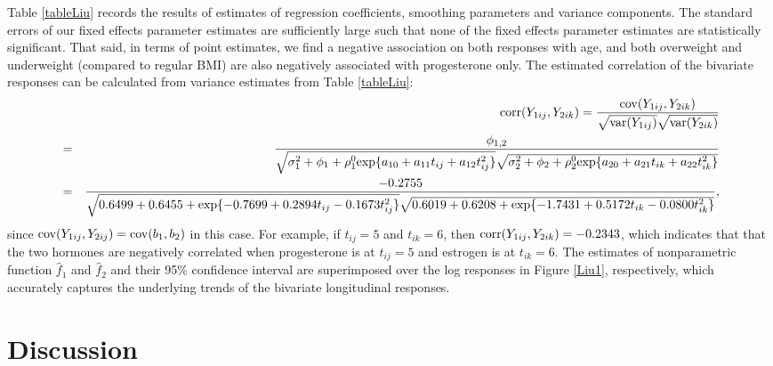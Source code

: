 \documentclass[review]{elsarticle}
\begin{document}
Table \ref{tableLiu} records the results of estimates of regression coefficients, smoothing parameters and variance components. The standard errors of our fixed effects parameter estimates are sufficiently large such that none of the fixed effects parameter estimates are statistically significant. That said, in terms of point estimates, we find a negative association on both responses with age, and  both overweight and underweight (compared to regular BMI) are also negatively associated with  progesterone only. 
The estimated correlation of the bivariate responses can be calculated from variance estimates from Table  \ref{tableLiu}:
\begin{eqnarray*}
&&
{\rm corr}(Y_{1ij}, Y_{2ik}) = {{\rm cov}(Y_{1ij}, Y_{2ik}) \over \sqrt {{\rm var}(Y_{1ij})} \sqrt {{\rm var}(Y_{2ik})}} \\
&=& {\phi_{1,2} \over 
\sqrt {\sigma_1^2 + \phi_1 + \rho_1^0 {\rm exp}\{a_{10} + a_{11}t_{ij} + a_{12}t_{ij}^2 \}} 
\sqrt {\sigma_2^2 + \phi_2 + \rho_2^0 {\rm exp}\{a_{20} + a_{21}t_{ik} + a_{22}t_{ik}^2 \}} } \\
&=& { -0.2755  \over 
\sqrt {0.6499 + 0.6455 + {\rm exp}\{-0.7699 + 0.2894 t_{ij} -0.1673 t_{ij}^2 \}} 
\sqrt {0.6019 + 0.6208 + {\rm exp}\{-1.7431 + 0.5172 t_{ik} -0.0800 t_{ik}^2 \}} },
\end{eqnarray*}
since ${\rm cov}(Y_{1ij}, Y_{2ij}) = {\rm cov}(b_{1}, b_{2})$ in this case.
For example, if $t_{ij} = 5$ and $t_{ik} = 6$, then ${\rm corr}(Y_{1ij}, Y_{2ik}) = -0.2343$, 
which indicates that that the two hormones are negatively correlated when progesterone is at $t_{ij} = 5$ and estrogen is at $t_{ik} = 6$.
The estimates of nonparametric function $\hat f_1$ and $\hat f_2$ and their 95\% confidence interval are superimposed over the log responses in Figure  \ref{Liu1}, respectively, which accurately captures the underlying trends of the bivariate longitudinal responses.


%
%
%
\section{Discussion} \label{discu}
\end{document}
